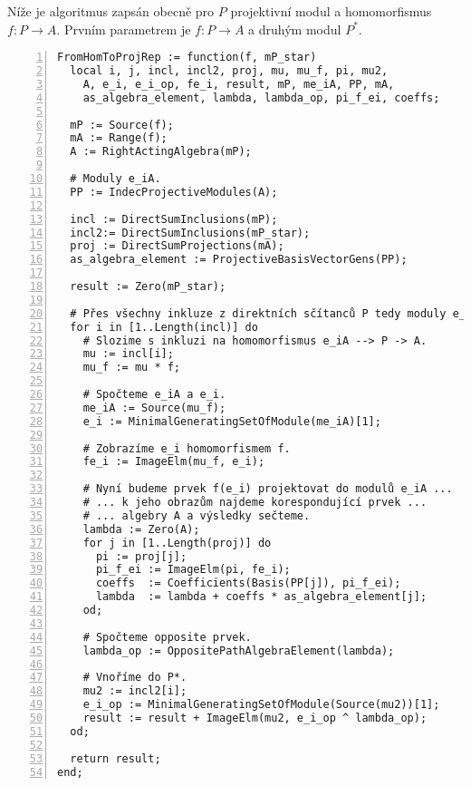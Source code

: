      
     Níže je algoritmus zapsán obecně pro $P$  projektivní modul a homomorfismus $f:P\to A$. 
     Prvním parametrem je $f:P\to A$ a druhým modul $P^*$.   
         
      \begin{Verbatim}[frame=single,numbers=left] 
FromHomToProjRep := function(f, mP_star)
  local i, j, incl, incl2, proj, mu, mu_f, pi, mu2,
    A, e_i, e_i_op, fe_i, result, mP, me_iA, PP, mA,
    as_algebra_element, lambda, lambda_op, pi_f_ei, coeffs;

  mP := Source(f);
  mA := Range(f);
  A := RightActingAlgebra(mP);

  # Moduly e_iA.
  PP := IndecProjectiveModules(A);

  incl := DirectSumInclusions(mP);
  incl2:= DirectSumInclusions(mP_star);
  proj := DirectSumProjections(mA);
  as_algebra_element := ProjectiveBasisVectorGens(PP);

  result := Zero(mP_star);

  # Přes všechny inkluze z direktních sčítanců P tedy moduly e_iA.
  for i in [1..Length(incl)] do
    # Slozime s inkluzi na homomorfismus e_iA --> P -> A.
    mu := incl[i];
    mu_f := mu * f;

    # Spočteme e_iA a e_i.
    me_iA := Source(mu_f);
    e_i := MinimalGeneratingSetOfModule(me_iA)[1];

    # Zobrazíme e_i homomorfismem f.
    fe_i := ImageElm(mu_f, e_i);

    # Nyní budeme prvek f(e_i) projektovat do modulů e_iA ...
    # ... k jeho obrazům najdeme korespondující prvek ...
    # ... algebry A a výsledky sečteme.
    lambda := Zero(A);
    for j in [1..Length(proj)] do
      pi := proj[j];
      pi_f_ei := ImageElm(pi, fe_i);
      coeffs  := Coefficients(Basis(PP[j]), pi_f_ei);
      lambda  := lambda + coeffs * as_algebra_element[j];
    od;

    # Spočteme opposite prvek.
    lambda_op := OppositePathAlgebraElement(lambda);

    # Vnoříme do P*.
    mu2 := incl2[i];
    e_i_op := MinimalGeneratingSetOfModule(Source(mu2))[1];
    result := result + ImageElm(mu2, e_i_op ^ lambda_op);
  od;

  return result;
end;      \end{Verbatim}
      
